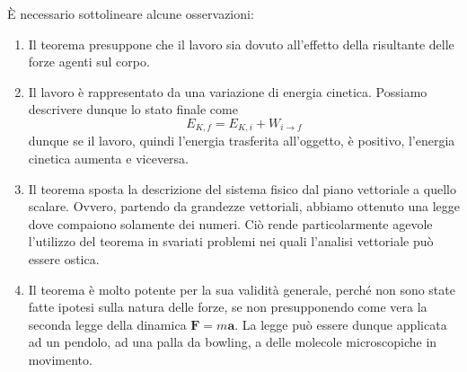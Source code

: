 \noindent È necessario sottolineare alcune osservazioni:
\begin{enumerate}
    \item Il teorema presuppone che il lavoro sia dovuto all'effetto della risultante delle forze agenti sul corpo.
    \item Il lavoro è rappresentato da una variazione di energia cinetica. Possiamo descrivere dunque lo stato finale
    come \[ E_{K,f} = E_{K,i} + W_{i\to f} \] dunque se il lavoro, quindi l'energia trasferita all'oggetto, è positivo,
    l'energia cinetica aumenta e viceversa.

    \item Il teorema sposta la descrizione del sistema fisico dal piano vettoriale a quello scalare. Ovvero, partendo
    da grandezze vettoriali, abbiamo ottenuto una legge dove compaiono solamente dei numeri. Ciò rende particolarmente agevole
    l'utilizzo del teorema in svariati problemi nei quali l'analisi vettoriale può essere ostica.

    \item Il teorema è molto potente per la sua validità generale, perché non sono state fatte ipotesi sulla natura delle
    forze, se non presupponendo come vera la seconda legge della dinamica $\textbf{F} = m\textbf{a}$.
    La legge può essere dunque applicata ad un pendolo, ad una palla da bowling,
    a delle molecole microscopiche in movimento.
\end{enumerate}

